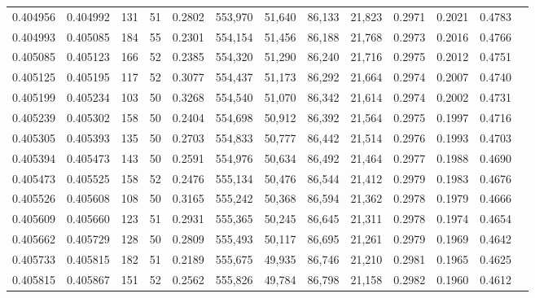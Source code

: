 \begin{tabular}{rrrrrrrrrrrrr}
0.404956 & 0.404992 &   131 &  51 &                                     0.2802 & 553,970 &  51,640 &  86,133 &  21,823 & 0.2971 & 0.2021 & 0.4783 \\
0.404993 & 0.405085 &   184 &  55 &                                     0.2301 & 554,154 &  51,456 &  86,188 &  21,768 & 0.2973 & 0.2016 & 0.4766 \\
0.405085 & 0.405123 &   166 &  52 &                                     0.2385 & 554,320 &  51,290 &  86,240 &  21,716 & 0.2975 & 0.2012 & 0.4751 \\
0.405125 & 0.405195 &   117 &  52 &                                     0.3077 & 554,437 &  51,173 &  86,292 &  21,664 & 0.2974 & 0.2007 & 0.4740 \\
0.405199 & 0.405234 &   103 &  50 &                                     0.3268 & 554,540 &  51,070 &  86,342 &  21,614 & 0.2974 & 0.2002 & 0.4731 \\
0.405239 & 0.405302 &   158 &  50 &                                     0.2404 & 554,698 &  50,912 &  86,392 &  21,564 & 0.2975 & 0.1997 & 0.4716 \\
0.405305 & 0.405393 &   135 &  50 &                                     0.2703 & 554,833 &  50,777 &  86,442 &  21,514 & 0.2976 & 0.1993 & 0.4703 \\
0.405394 & 0.405473 &   143 &  50 &                                     0.2591 & 554,976 &  50,634 &  86,492 &  21,464 & 0.2977 & 0.1988 & 0.4690 \\
0.405473 & 0.405525 &   158 &  52 &                                     0.2476 & 555,134 &  50,476 &  86,544 &  21,412 & 0.2979 & 0.1983 & 0.4676 \\
0.405526 & 0.405608 &   108 &  50 &                                     0.3165 & 555,242 &  50,368 &  86,594 &  21,362 & 0.2978 & 0.1979 & 0.4666 \\
0.405609 & 0.405660 &   123 &  51 &                                     0.2931 & 555,365 &  50,245 &  86,645 &  21,311 & 0.2978 & 0.1974 & 0.4654 \\
0.405662 & 0.405729 &   128 &  50 &                                     0.2809 & 555,493 &  50,117 &  86,695 &  21,261 & 0.2979 & 0.1969 & 0.4642 \\
0.405733 & 0.405815 &   182 &  51 &                                     0.2189 & 555,675 &  49,935 &  86,746 &  21,210 & 0.2981 & 0.1965 & 0.4625 \\
0.405815 & 0.405867 &   151 &  52 &                                     0.2562 & 555,826 &  49,784 &  86,798 &  21,158 & 0.2982 & 0.1960 & 0.4612 \\

\end{tabular}
